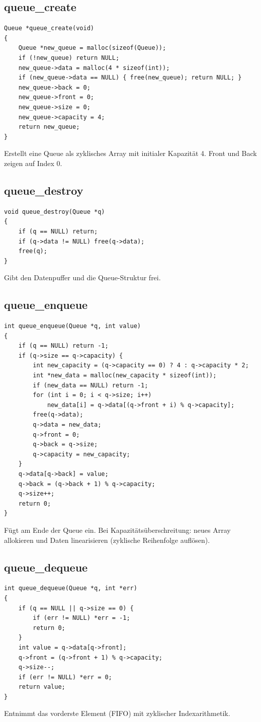 \documentclass[10pt, a4paper]{article}
\begin{document}
\subsection{queue\_create}
\begin{lstlisting}
Queue *queue_create(void)
{
    Queue *new_queue = malloc(sizeof(Queue));
    if (!new_queue) return NULL;
    new_queue->data = malloc(4 * sizeof(int));
    if (new_queue->data == NULL) { free(new_queue); return NULL; }
    new_queue->back = 0;
    new_queue->front = 0;
    new_queue->size = 0;
    new_queue->capacity = 4;
    return new_queue;
}
\end{lstlisting}
Erstellt eine Queue als zyklisches Array mit initialer Kapazit\"at 4. Front und Back zeigen auf Index 0.

\subsection{queue\_destroy}
\begin{lstlisting}
void queue_destroy(Queue *q)
{
    if (q == NULL) return;
    if (q->data != NULL) free(q->data);
    free(q);
}
\end{lstlisting}
Gibt den Datenpuffer und die Queue-Struktur frei.

\subsection{queue\_enqueue}
\begin{lstlisting}
int queue_enqueue(Queue *q, int value)
{
    if (q == NULL) return -1;
    if (q->size == q->capacity) {
        int new_capacity = (q->capacity == 0) ? 4 : q->capacity * 2;
        int *new_data = malloc(new_capacity * sizeof(int));
        if (new_data == NULL) return -1;
        for (int i = 0; i < q->size; i++)
            new_data[i] = q->data[(q->front + i) % q->capacity];
        free(q->data);
        q->data = new_data;
        q->front = 0;
        q->back = q->size;
        q->capacity = new_capacity;
    }
    q->data[q->back] = value;
    q->back = (q->back + 1) % q->capacity;
    q->size++;
    return 0;
}
\end{lstlisting}
F\"ugt am Ende der Queue ein. Bei Kapazit\"ats\"uberschreitung: neues Array allokieren und Daten linearisieren (zyklische Reihenfolge aufl\"osen).

\subsection{queue\_dequeue}
\begin{lstlisting}
int queue_dequeue(Queue *q, int *err)
{
    if (q == NULL || q->size == 0) {
        if (err != NULL) *err = -1;
        return 0;
    }
    int value = q->data[q->front];
    q->front = (q->front + 1) % q->capacity;
    q->size--;
    if (err != NULL) *err = 0;
    return value;
}
\end{lstlisting}
Entnimmt das vorderste Element (FIFO) mit zyklischer Indexarithmetik.
\end{document}
